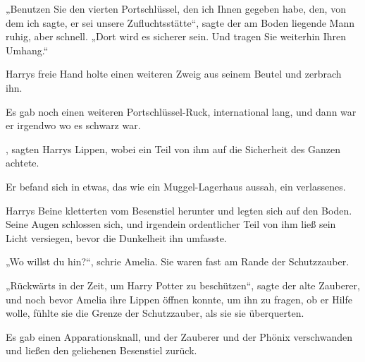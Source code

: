 „Benutzen Sie den vierten Portschlüssel, den ich Ihnen gegeben habe, den, von dem ich sagte, er sei unsere Zufluchtsstätte“, sagte der am Boden liegende Mann ruhig, aber schnell. „Dort wird es sicherer sein. Und tragen Sie weiterhin Ihren Umhang.“

Harrys freie Hand holte einen weiteren Zweig aus seinem Beutel und zerbrach ihn.

Es gab noch einen weiteren Portschlüssel-Ruck, international lang, und dann war er irgendwo wo es schwarz war.

, sagten Harrys Lippen, wobei ein Teil von ihm auf die Sicherheit des Ganzen achtete.

Er befand sich in etwas, das wie ein Muggel-Lagerhaus aussah, ein verlassenes.

Harrys Beine kletterten vom Besenstiel herunter und legten sich auf den Boden. Seine Augen schlossen sich, und irgendein ordentlicher Teil von ihm ließ sein Licht versiegen, bevor die Dunkelheit ihn umfasste.

\later

„Wo willst du hin?“, schrie Amelia. Sie waren fast am Rande der Schutzzauber.

„Rückwärts in der Zeit, um Harry Potter zu beschützen“, sagte der alte Zauberer, und noch bevor Amelia ihre Lippen öffnen konnte, um ihn zu fragen, ob er Hilfe wolle, fühlte sie die Grenze der Schutzzauber, als sie sie überquerten.

Es gab einen Apparationsknall, und der Zauberer und der Phönix verschwanden und ließen den geliehenen Besenstiel zurück.

